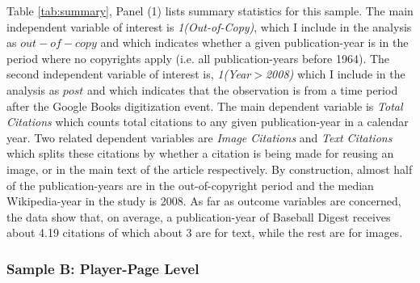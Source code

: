 \documentclass[11pt]{article}
\begin{document}

Table \ref{tab:summary}, Panel (1) lists summary statistics for this sample. The main independent variable of interest is \emph{1(Out-of-Copy)}, which I include in the analysis as $out-of-copy$ and which indicates whether a given publication-year is in the period where no copyrights apply (i.e. all publication-years before 1964). The second independent variable of interest is, \emph{1(Year$>$2008)} which I include in the analysis as $post$ and which indicates that the observation is from a time period after the Google Books digitization event. The main dependent variable is \emph{Total Citations} which counts total citations to any given publication-year in a calendar year. Two related dependent variables are \emph{Image Citations} and \emph{Text Citations} which splits these citations by whether a citation is being made for reusing an image, or in the main text of the article respectively. By construction, almost half of the publication-years are in the out-of-copyright period and the median Wikipedia-year in the study is 2008. As far as outcome variables are concerned, the data show that, on average, a publication-year of Baseball Digest receives about 4.19 citations of which about 3 are for text, while the rest are for images. 


\subsubsection{Sample B: Player-Page Level}
\end{document}
